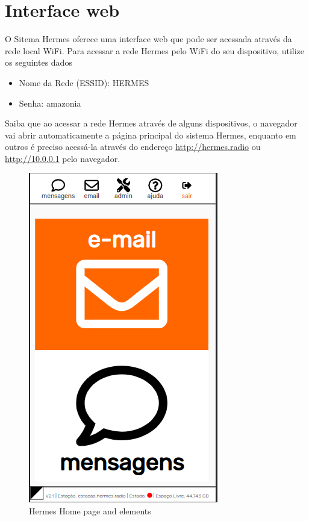 \documentclass[11pt,a4paper]{article}
\begin{document}
\section{Interface web}

O Sitema Hermes oferece uma interface web que pode ser acessada através da rede local WiFi. Para acessar a rede Hermes pelo WiFi do seu dispositivo, utilize os seguintes dados 
\begin{itemize}
    \item Nome da Rede (ESSID): HERMES
    \item Senha: amazonia
\end{itemize}

Saiba que ao acessar a rede Hermes através de alguns dispositivos, o navegador vai abrir automaticamente a página principal do sistema Hermes, enquanto em outros é preciso acessá-la através do endereço \url{http://hermes.radio} ou \url{http://10.0.0.1} pelo navegador.

   \begin{figure}[H]
    \includegraphics[width=0.5\columnwidth]{screenshots/frontend/pt_kn/landing.png}
    \caption{Hermes Home page and elements}
    \label{fig:interface}
    \end{figure}
    
\end{document}
